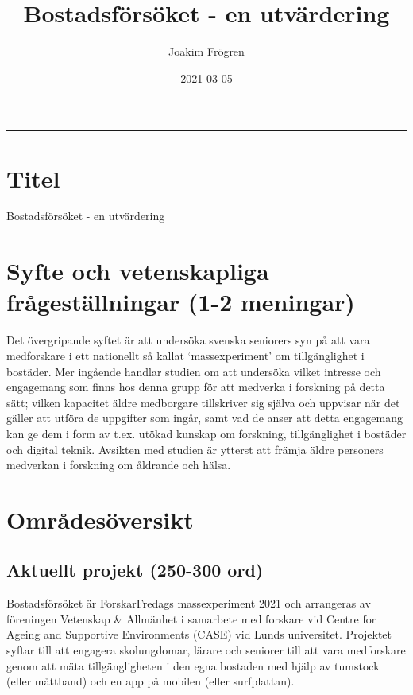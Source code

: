 \documentclass[]{tufte-handout}
\title[Forskningsplan för studie III]{Bostadsförsöket - en utvärdering}
\author{Joakim Frögren}
\date{2021-03-05}
\begin{document}
\maketitle




\begin{center}\rule{0.5\linewidth}{0.5pt}\end{center}

\hypertarget{titel}{%
\section{Titel}\label{titel}}

Bostadsförsöket - en utvärdering

\hypertarget{syfte-och-vetenskapliga-fruxe5gestuxe4llningar-1-2-meningar}{%
\section{Syfte och vetenskapliga frågeställningar (1-2
meningar)}\label{syfte-och-vetenskapliga-fruxe5gestuxe4llningar-1-2-meningar}}

Det övergripande syftet är att undersöka svenska seniorers syn på att
vara medforskare i ett nationellt så kallat `massexperiment' om
tillgänglighet i bostäder. Mer ingående handlar studien om att undersöka
vilket intresse och engagemang som finns hos denna grupp för att
medverka i forskning på detta sätt; vilken kapacitet äldre medborgare
tillskriver sig själva och uppvisar när det gäller att utföra de
uppgifter som ingår, samt vad de anser att detta engagemang kan ge dem i
form av t.ex. utökad kunskap om forskning, tillgänglighet i bostäder och
digital teknik. Avsikten med studien är ytterst att främja äldre
personers medverkan i forskning om åldrande och hälsa.

\hypertarget{omruxe5desuxf6versikt}{%
\section{Områdesöversikt}\label{omruxe5desuxf6versikt}}

\hypertarget{aktuellt-projekt-250-300-ord}{%
\subsection{Aktuellt projekt (250-300
ord)}\label{aktuellt-projekt-250-300-ord}}

Bostadsförsöket är ForskarFredags massexperiment 2021 och arrangeras av
föreningen Vetenskap \& Allmänhet i samarbete med forskare vid Centre
for Ageing and Supportive Environments (CASE) vid Lunds universitet.
Projektet syftar till att engagera skolungdomar, lärare och seniorer
till att vara medforskare genom att mäta tillgängligheten i den egna
bostaden med hjälp av tumstock (eller måttband) och en app på mobilen
(eller surfplattan).
\end{document}
